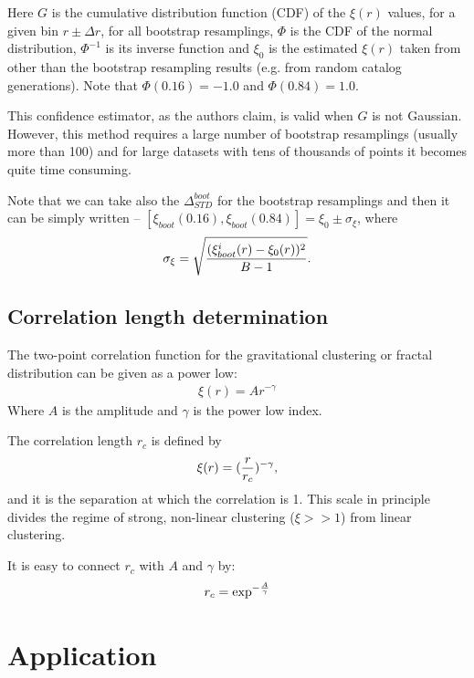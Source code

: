 Here $G$ is the cumulative distribution function (CDF) of the $\xi(r)$
values, for a given bin $r \pm \Delta r$, for all bootstrap
resamplings, $\Phi$ is the CDF of the normal distribution, $\Phi^{-1}$
is its inverse function and $\xi_0$ is the estimated $\xi(r)$ taken
from other than the bootstrap resampling results (e.g. from random
catalog generations). Note that $\Phi(0.16) = -1.0$ and $\Phi(0.84) =
1.0$.

This confidence estimator, as the authors \cite{cf:efron86} claim, is
valid when $G$ is not Gaussian. However, this method requires a large
number of bootstrap resamplings (usually more than 100) and for large
datasets with tens of thousands of points it becomes quite time
consuming.

Note that we can take also the $\Delta^{boot}_{STD}$ for the bootstrap
resamplings and then it can be simply written --
$[\xi_{boot}(0.16),\xi_{boot}(0.84)] = \xi_0 \pm \sigma_{\xi}$,
where
\begin{equation} 
\sigma_{\xi} = \sqrt{ (\xi^{i}_{boot}(r) - \xi_{0}(r))^2 \over B-1}.
\end{equation} 


\subsection{Correlation length determination}

The two-point correlation function for the gravitational clustering or 
fractal distribution can be given as a power low:
\begin{eqnarray}
 \xi(r) = A r^{-\gamma}
\end{eqnarray}
Where $A$ is the amplitude and $\gamma$ is the power low index.

The correlation length $r_c$ is defined by
\begin{eqnarray}
 \xi(r) = ({r\over r_c}) ^{-\gamma},
\end{eqnarray}
and it is the separation at which the correlation is 1. This scale in
principle divides the regime of strong, non-linear clustering ($\xi >> 
1$) from linear clustering.

It is easy to connect $r_c$ with $A$ and $\gamma$ by:
\begin{eqnarray}
r_c = \exp^{-{A \over \gamma}}
\end{eqnarray}



\section{Application}
